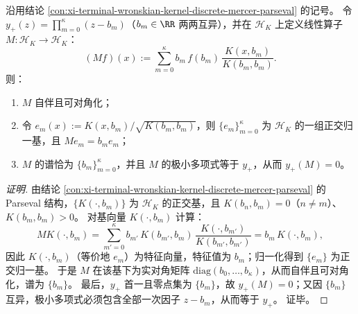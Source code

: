 
\begin{conclusion}\label{con:xi-terminal-wronskian-compressed-multiplication-spectrum-minpoly}
沿用结论 \ref{con:xi-terminal-wronskian-kernel-discrete-mercer-parseval} 的记号。
令 \(y_{+}(z)=\prod_{m=0}^{\kappa}(z-b_m)\)（\(b_m\in\RR\) 两两互异），并在 \(\mathcal{H}_K\) 上定义线性算子 \(M:\mathcal{H}_K\to\mathcal{H}_K\)：
\[
(Mf)(x):=\sum_{m=0}^{\kappa} b_m\,f(b_m)\,\frac{K(x,b_m)}{K(b_m,b_m)}.
\]
则：
\begin{enumerate}
  \item \(M\) 自伴且可对角化；
  \item 令 \(e_m(x):=K(x,b_m)/\sqrt{K(b_m,b_m)}\)，则 \(\{e_m\}_{m=0}^{\kappa}\) 为 \(\mathcal{H}_K\) 的一组正交归一基，且 \(Me_m=b_m e_m\)；
  \item \(M\) 的谱恰为 \(\{b_m\}_{m=0}^{\kappa}\)，并且 \(M\) 的极小多项式等于 \(y_{+}\)，从而 \(y_{+}(M)=0\)。
\end{enumerate}
\end{conclusion}
\begin{proof}[证明]
由结论 \ref{con:xi-terminal-wronskian-kernel-discrete-mercer-parseval} 的 Parseval 结构，\(\{K(\cdot,b_m)\}\) 为 \(\mathcal{H}_K\) 的正交基，且
\(K(b_n,b_m)=0\)（\(n\neq m\)）、\(K(b_m,b_m)>0\)。
对基向量 \(K(\cdot,b_m)\) 计算：
\[
M K(\cdot,b_m)
=\sum_{m'=0}^{\kappa} b_{m'}\,K(b_{m'},b_m)\,\frac{K(\cdot,b_{m'})}{K(b_{m'},b_{m'})}
=b_m\,K(\cdot,b_m),
\]
因此 \(K(\cdot,b_m)\)（等价地 \(e_m\)）为特征向量，特征值为 \(b_m\)；归一化得到 \(\{e_m\}\) 为正交归一基。
于是 \(M\) 在该基下为实对角矩阵 \(\mathrm{diag}(b_0,\dots,b_\kappa)\)，从而自伴且可对角化，谱为 \(\{b_m\}\)。
最后，\(y_{+}\) 首一且零点集为 \(\{b_m\}\)，故 \(y_{+}(M)=0\)；又因 \(\{b_m\}\) 互异，极小多项式必须包含全部一次因子 \(z-b_m\)，从而等于 \(y_{+}\)。
证毕。
\end{proof}

